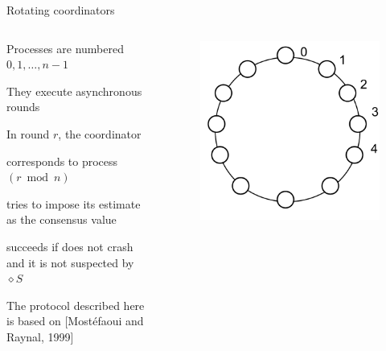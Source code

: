\begin{frame}{Rotating coordinators}
	
\begin{columns}
\begin{column}{0.6\textwidth}
\BIL
\item Processes are numbered $0, 1, \ldots, n-1$
\item They execute asynchronous rounds
\item In round $r$, the coordinator
  \BI
  \item corresponds to process $(r \bmod n)$
  \item tries to impose its estimate as the consensus value
  \item succeeds if does not crash and it is not suspected by $\diamond S$
  \EI
\item The protocol described here is based on [Mostéfaoui and Raynal, 1999]
\EIL
\end{column}
\begin{column}{0.4\textwidth}
	\begin{figure}
		\begin{overprint}
			\includegraphics[width=\textwidth]{rotating0}

\end{overprint}
\end{figure}
\end{column}
\end{columns}
\end{frame}
